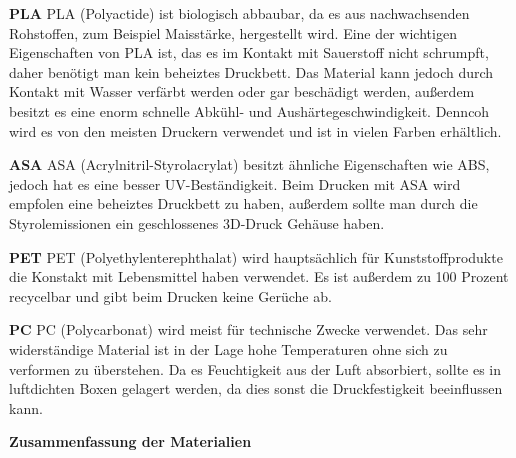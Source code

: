 \textbf{PLA}
PLA (Polyactide) ist biologisch abbaubar, da es aus nachwachsenden Rohstoffen, zum Beispiel Maisstärke, hergestellt wird.
Eine der wichtigen Eigenschaften von PLA ist, das es im Kontakt mit Sauerstoff nicht schrumpft, daher benötigt man kein beheiztes
Druckbett. Das Material kann jedoch durch Kontakt mit Wasser verfärbt werden oder gar beschädigt werden, außerdem besitzt
es eine enorm schnelle Abkühl- und Aushärtegeschwindigkeit. Denncoh wird es von den meisten Druckern verwendet und ist
in vielen Farben erhältlich.

\textbf{ASA}
ASA (Acrylnitril-Styrolacrylat) besitzt ähnliche Eigenschaften wie ABS, jedoch hat es eine besser UV-Beständigkeit.
Beim Drucken mit ASA wird empfolen eine beheiztes Druckbett zu haben, außerdem sollte man durch die Styrolemissionen
ein geschlossenes 3D-Druck Gehäuse haben.

\textbf{PET}
PET (Polyethylenterephthalat) wird hauptsächlich für Kunststoffprodukte die Konstakt mit Lebensmittel haben verwendet.
Es ist außerdem zu 100 Prozent recycelbar und gibt beim Drucken keine Gerüche ab.

\textbf{PC}
PC (Polycarbonat) wird meist für technische Zwecke verwendet. Das sehr widerständige Material ist in der Lage hohe
Temperaturen ohne sich zu verformen zu überstehen. Da es Feuchtigkeit aus der Luft absorbiert, sollte es in luftdichten
Boxen gelagert werden, da dies sonst die Druckfestigkeit beeinflussen kann.

\textbf{Zusammenfassung der Materialien}

\begin{table}[H]
\centering
{}
    \caption{Vergleich der 3D-Druck Materialien}
\end{table}

